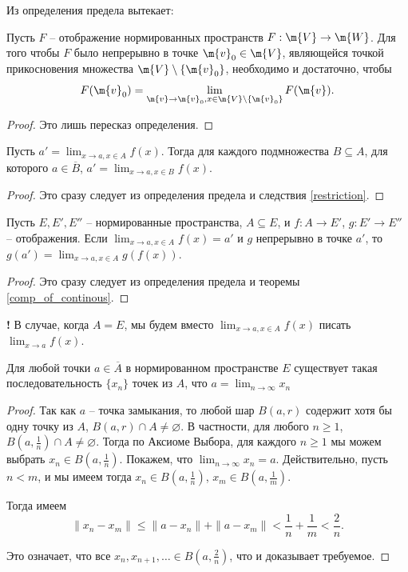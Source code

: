 Из определения предела вытекает:
\begin{theorem}\label{criteria_of_continous_on_Rn}
Пусть $F$  -- отображение нормированных пространств $F: \m{V} \to \m{W}$. Для того чтобы $F$ было непрерывно в точке $\m{v}_0 \in \m{V}$, являющейся точкой прикосновения множества $\m{V}\setminus\{\m{v}_0\}$, необходимо и достаточно, чтобы $$F(\m{v}_0) = \lim_{\m{v} \to \m{v}_0, x\in \m{V} \setminus \{\m{v}_0\}}F(\m{v}).$$
\end{theorem}
\begin{proof}
    Это лишь пересказ определения.
\end{proof}

\begin{theorem}\label{limit_for_any_subset}
    Пусть $a' = \lim_{x \to a, x \in A} f(x)$. Тогда для каждого подмножества $B \subseteq A$, для которого $a \in \overline{B}$, $a' = \lim_{x \to a, x \in B}f(x)$.
\end{theorem}

\begin{proof}
    Это сразу следует из определения предела и следствия \ref{restriction}.
\end{proof}

\begin{theorem}\label{lim_of_composition}
    Пусть $E,E',E''$ -- нормированные пространства, $A \subseteq E$, и $f:A \to E'$, $g:E' \to E''$ -- отображения. Если $\lim_{x \to a, x \in A}f(x) = a'$ и $g$ непрерывно в точке $a'$, то $g(a') = \lim_{x \to a, x \in A}g(f(x))$. 
\end{theorem}
\begin{proof}
    Это сразу следует из определения предела и теоремы \ref{comp_of_continous}.
\end{proof}

\begin{mydanger}{\bf{!}}
    В случае, когда $A = E$, мы будем вместо $\lim_{x \to a, x \in A}f(x)$  писать $\lim_{x \to a}f(x).$
\end{mydanger}

\begin{lemma}\label{choice_of_seqeunce_n}
    Для любой точки $a \in \overline{A}$ в нормированном пространстве $E$ существует такая последовательность $\{x_n\}$ точек из $A$, что $a = \lim_{n \to \infty} x_n$
\end{lemma}

\begin{proof}
    Так как $a$ -- точка замыкания, то любой шар $B(a, r)$ содержит хотя бы одну точку из $A$, \ie $B(a, r) \cap A \ne \varnothing$. В частности, для любого $n\ge 1$, $B(a, \frac{1}{n}) \cap A \ne \varnothing$. Тогда по Аксиоме Выбора, для каждого $n\ge 1$ мы можем выбрать $x_n \in B(a, \frac{1}{n})$. Покажем, что $\lim_{n \to \infty} x_n = a$. Действительно, пусть $n<m$, и мы имеем тогда $x_n \in B(a, \frac{1}{n})$, $x_m \in B(a, \frac{1}{m})$. 

    Тогда имеем
    \[
     \|x_n - x_m\| \le \|a-x_n\| + \|a-x_m\| <\frac{1}{n} + \frac{1}{m} < \frac{2}{n}.
    \]

Это означает, что все $x_n, x_{n+1}, \ldots \in B(a, \frac{2}{n})$, что и доказывает требуемое.
\end{proof}

